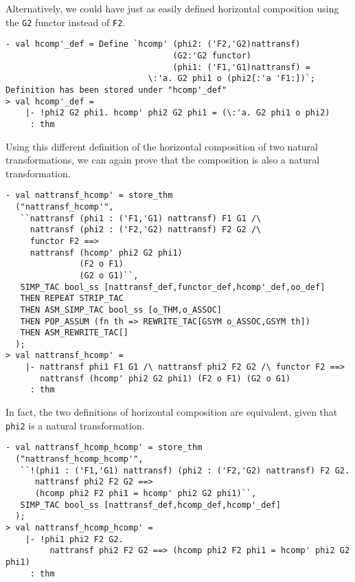 Alternatively, we could have just as easily defined horizontal composition using
the \texttt{G2} functor instead of \texttt{F2}.
\begin{session}
\begin{verbatim}
- val hcomp'_def = Define `hcomp' (phi2: ('F2,'G2)nattransf)
                                  (G2:'G2 functor)
                                  (phi1: ('F1,'G1)nattransf) =
                             \:'a. G2 phi1 o (phi2[:'a 'F1:])`;
Definition has been stored under "hcomp'_def"
> val hcomp'_def =
    |- !phi2 G2 phi1. hcomp' phi2 G2 phi1 = (\:'a. G2 phi1 o phi2)
     : thm
\end{verbatim}
\end{session}

Using this different definition of the horizontal composition of two natural 
transformations, we can again prove that the composition is also a natural 
transformation.
\begin{session}
\begin{verbatim}
- val nattransf_hcomp' = store_thm
  ("nattransf_hcomp'",
   ``nattransf (phi1 : ('F1,'G1) nattransf) F1 G1 /\
     nattransf (phi2 : ('F2,'G2) nattransf) F2 G2 /\
     functor F2 ==>
     nattransf (hcomp' phi2 G2 phi1)
               (F2 o F1)
               (G2 o G1)``,
   SIMP_TAC bool_ss [nattransf_def,functor_def,hcomp'_def,oo_def]
   THEN REPEAT STRIP_TAC
   THEN ASM_SIMP_TAC bool_ss [o_THM,o_ASSOC]
   THEN POP_ASSUM (fn th => REWRITE_TAC[GSYM o_ASSOC,GSYM th])
   THEN ASM_REWRITE_TAC[]
  );
> val nattransf_hcomp' =
    |- nattransf phi1 F1 G1 /\ nattransf phi2 F2 G2 /\ functor F2 ==>
       nattransf (hcomp' phi2 G2 phi1) (F2 o F1) (G2 o G1)
     : thm
\end{verbatim}
\end{session}

In fact, the two definitions of horizontal composition are equivalent, 
given that \texttt{phi2} is a natural transformation.
\begin{session}
\begin{verbatim}
- val nattransf_hcomp_hcomp' = store_thm
  ("nattransf_hcomp_hcomp'",
   ``!(phi1 : ('F1,'G1) nattransf) (phi2 : ('F2,'G2) nattransf) F2 G2.
      nattransf phi2 F2 G2 ==>
      (hcomp phi2 F2 phi1 = hcomp' phi2 G2 phi1)``,
   SIMP_TAC bool_ss [nattransf_def,hcomp_def,hcomp'_def]
  );
> val nattransf_hcomp_hcomp' =
    |- !phi1 phi2 F2 G2.
         nattransf phi2 F2 G2 ==> (hcomp phi2 F2 phi1 = hcomp' phi2 G2 phi1)
     : thm
\end{verbatim}
\end{session}


